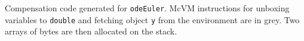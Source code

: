 \label{fig:comp-code} Compensation code generated for {\tt odeEuler}. McVM instructions for unboxing variables to {\tt double} and fetching object {\tt y} from the environment are in grey. Two arrays of bytes are then allocated on the stack.
